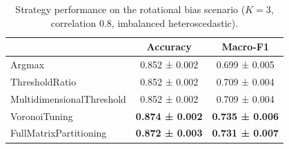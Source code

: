 \begin{table}[H]
    \centering
    \small
    \caption{Strategy performance on the rotational bias scenario ($K{=}3$, correlation $0.8$, imbalanced heteroscedastic).}%
    \label{tab:results-rotational-bias}
    \begin{tabular}{lcc}
    \toprule
    & Accuracy & Macro-F1 \\
    \midrule
    Argmax & 0.852 ± 0.002 & 0.699 ± 0.005 \\
    ThresholdRatio & 0.852 ± 0.002 & 0.709 ± 0.004 \\
    MultidimensionalThreshold & 0.852 ± 0.002 & 0.709 ± 0.004 \\
    VoronoiTuning & \textbf{0.874 ± 0.002} & \textbf{0.735 ± 0.006} \\
    FullMatrixPartitioning & \textbf{0.872 ± 0.003} & \textbf{0.731 ± 0.007} \\
    \bottomrule
\end{tabular}
\end{table}

